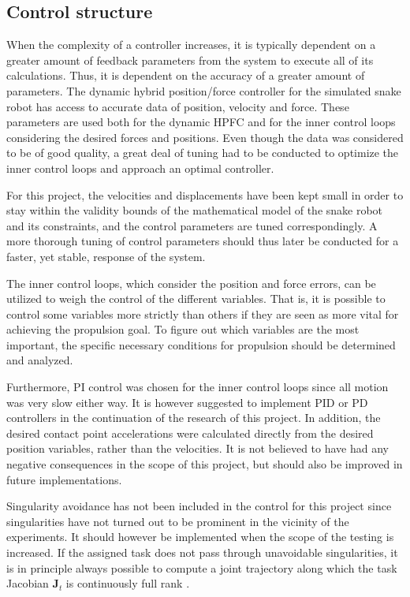 \subsection{Control structure}

When the complexity of a controller increases, it is typically dependent on a greater amount of feedback parameters from the system to execute all of its calculations. Thus, it is dependent on the accuracy of a greater amount of parameters. The dynamic hybrid position/force controller for the simulated snake robot has access to accurate data of position, velocity and force. These parameters are used both for the dynamic HPFC and for the inner control loops considering the desired forces and positions. Even though the data was considered to be of good quality, a great deal of tuning had to be conducted to optimize the inner control loops and approach an optimal controller. 

For this project, the velocities and displacements have been kept small in order to stay within the validity bounds of the mathematical model of the snake robot and its constraints, and the control parameters are tuned correspondingly. A more thorough tuning of control parameters should thus later be conducted for a faster, yet stable, response of the system.

The inner control loops, which consider the position and force errors, can be utilized to weigh the control of the different variables. That is, it is possible to control some variables more strictly than others if they are seen as more vital for achieving the propulsion goal. To figure out which variables are the most important, the specific necessary conditions for propulsion should be determined and analyzed.

Furthermore, PI control was chosen for the inner control loops since all motion was very slow either way. It is however suggested to implement PID or PD controllers in the continuation of the research of this project. In addition, the desired contact point accelerations were calculated directly from the desired position variables, rather than the velocities. It is not believed to have had any negative consequences in the scope of this project, but should also be improved in future implementations.

Singularity avoidance has not been included in the control for this project since singularities have not turned out to be prominent in the vicinity of the experiments. It should however be implemented when the scope of the testing is increased. If the assigned task does not pass through unavoidable singularities, it is in principle always possible to compute a joint trajectory along which the task Jacobian $\mathbf{J}_t$ is continuously full rank \cite{chiaverini2008kinematically}.

